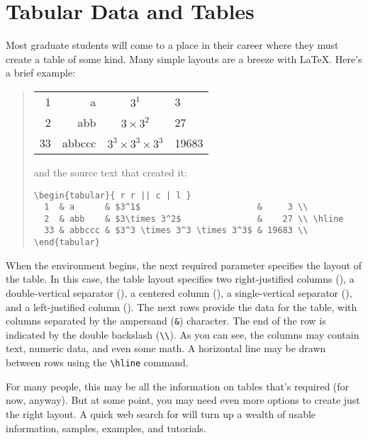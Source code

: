 \chapter{Tabular Data and Tables}

Most graduate students will come to a place in their career where they
must create a table of some kind.  Many simple layouts are a breeze
with \LaTeX.  Here's a brief example:

\begin{quote}
\begin{tabular}{ r r || c | l }
  1  & a      & $3^1$                      &     3 \\
  2  & abb    & $3\times 3^2$              &    27 \\ \hline
  33 & abbccc & $3^3 \times 3^3 \times 3^3$ & 19683 \\
\end{tabular}
\hskip12pt and the source text that created it:
\begin{verbatim}
\begin{tabular}{ r r || c | l }
  1  & a      & $3^1$                       &     3 \\
  2  & abb    & $3\times 3^2$               &    27 \\ \hline
  33 & abbccc & $3^3 \times 3^3 \times 3^3$ & 19683 \\
\end{tabular}
\end{verbatim}
\end{quote}

When the  environment begins, the next required parameter
specifies the layout of the table.  In this case, the table layout
specifies two right-justified columns (), a double-vertical
separator (\lit{||}), a centered column (), a single-vertical
separator (\lit{|}), and a left-justified column ().  The next
rows provide the data for the table, with columns separated by the
ampersand (\verb|&|) character.  The end of the row is indicated by
the double backslash (\verb|\\|).  As you can see, the columns may
contain text, numeric data, and even some math.  A horizontal line may
be drawn between rows using the \verb|\hline| command.

For many people, this may be all the information on tables that's
required (for now, anyway).  But at some point, you may need even more
options to create just the right layout.  A quick web search for
 will turn up a wealth of usable information,
samples, examples, and tutorials.

